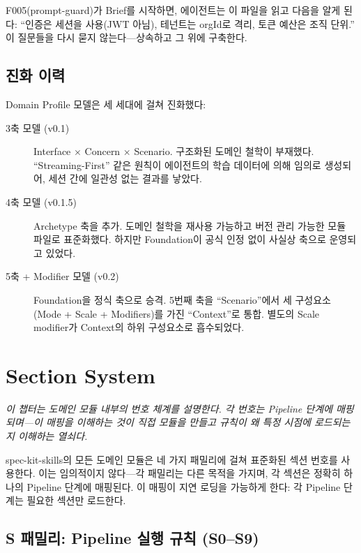\documentclass[11pt,a4paper,openright,twoside]{report}
\begin{document}
F005(prompt-guard)가 Brief를 시작하면, 에이전트는 이 파일을 읽고 다음을 알게 된다: ``인증은 세션을 사용(JWT 아님), 테넌트는 orgId로 격리, 토큰 예산은 조직 단위.'' 이 질문들을 다시 묻지 않는다---상속하고 그 위에 구축한다.

\section{진화 이력}

Domain Profile 모델은 세 세대에 걸쳐 진화했다:

\begin{description}
  \item[3축 모델 (v0.1)] Interface $\times$ Concern $\times$ Scenario. 구조화된 도메인 철학이 부재했다. ``Streaming-First'' 같은 원칙이 에이전트의 학습 데이터에 의해 임의로 생성되어, 세션 간에 일관성 없는 결과를 낳았다.
  \item[4축 모델 (v0.1.5)] Archetype 축을 추가. 도메인 철학을 재사용 가능하고 버전 관리 가능한 모듈 파일로 표준화했다. 하지만 Foundation이 공식 인정 없이 사실상 축으로 운영되고 있었다.
  \item[5축 + Modifier 모델 (v0.2)] Foundation을 정식 축으로 승격. 5번째 축을 ``Scenario''에서 세 구성요소(Mode + Scale + Modifiers)를 가진 ``Context''로 통합. 별도의 Scale modifier가 Context의 하위 구성요소로 흡수되었다.
\end{description}


\chapter{Section System}
\label{ch:sections}

\textit{이 챕터는 도메인 모듈 내부의 번호 체계를 설명한다. 각 번호는 Pipeline 단계에 매핑되며---이 매핑을 이해하는 것이 직접 모듈을 만들고 규칙이 왜 특정 시점에 로드되는지 이해하는 열쇠다.}

spec-kit-skills의 모든 도메인 모듈은 네 가지 패밀리에 걸쳐 표준화된 섹션 번호를 사용한다. 이는 임의적이지 않다---각 패밀리는 다른 목적을 가지며, 각 섹션은 정확히 하나의 Pipeline 단계에 매핑된다. 이 매핑이 지연 로딩을 가능하게 한다: 각 Pipeline 단계는 필요한 섹션만 로드한다.

\section{S 패밀리: Pipeline 실행 규칙 (S0--S9)}
\end{document}
